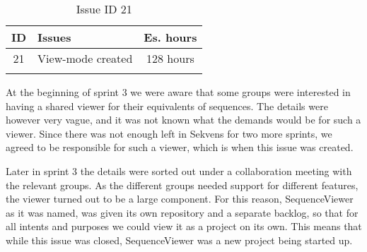 \begin{longtable} { | c | p{12cm} | c | } 
\hline
	ID 	&	Issues	&		 Es. hours \\\hline
	21 	&	View-mode created	&	128 hours \\\hline
\caption{Issue ID 21}
\label{tab:spr3_viewmodecreated}
\end{longtable}

At the beginning of sprint 3 we were aware that some groups were interested in having a shared viewer for their equivalents of sequences. The details were however very vague, and it was not known what the demands would be for such a viewer. Since there was not enough left in Sekvens for two more sprints, we agreed to be responsible for such a viewer, which is when this issue was created.

Later in sprint 3 the details were sorted out under a collaboration meeting with the relevant groups. As the different groups needed support for different features, the viewer turned out to be a large component. For this reason, SequenceViewer as it was named, was given its own repository and a separate backlog, so that for all intents and purposes we could view it as a project on its own. This means that while this issue was closed, SequenceViewer was a new project being started up. 